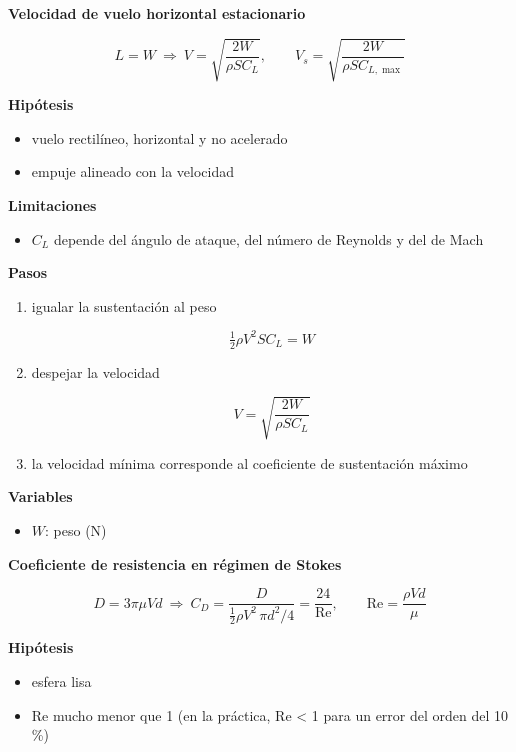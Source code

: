 \documentclass[10pt,openany]{book}
\begin{document}
\begin{tcolorbox}[title={Desarrollos del modelo}, studiumdef, breakable]

\noindent\textbf{Velocidad de vuelo horizontal estacionario}

\begin{equation}
L = W\ \Rightarrow\ V = \sqrt{\frac{2W}{\rho S C_L}},\qquad V_s = \sqrt{\frac{2W}{\rho S C_{L,\max}}}
\label{eq:c07-vuelo}
\end{equation}

\noindent\textbf{Hipótesis}
\begin{itemize}
\item vuelo rectilíneo, horizontal y no acelerado
\item empuje alineado con la velocidad
\end{itemize}

\noindent\textbf{Limitaciones}
\begin{itemize}
\item \(C_L\) depende del ángulo de ataque, del número de Reynolds y del de Mach
\end{itemize}

\noindent\textbf{Pasos}
\begin{enumerate}
\item
igualar la sustentación al peso

\[
\tfrac12\rho V^{2} S C_L = W
\]
\item
despejar la velocidad

\[
V = \sqrt{\frac{2W}{\rho S C_L}}
\]
\item
la velocidad mínima corresponde al coeficiente de sustentación máximo
\end{enumerate}

\noindent\textbf{Variables}
\begin{itemize}
\item $W$: peso ($\mathrm{N}$)
\end{itemize}



\noindent\textbf{Coeficiente de resistencia en régimen de Stokes}

\begin{equation}
D = 3\pi\mu V d\ \Rightarrow\ C_D = \frac{D}{\tfrac12\rho V^{2}\,\pi d^{2}/4} = \frac{24}{\mathrm{Re}},\qquad \mathrm{Re} = \frac{\rho V d}{\mu}
\label{eq:c07-stokes-cd}
\end{equation}

\noindent\textbf{Hipótesis}
\begin{itemize}
\item esfera lisa
\item Re mucho menor que 1 (en la práctica, Re < 1 para un error del orden del 10 \%)
\end{itemize}


\end{tcolorbox}
\end{document}
